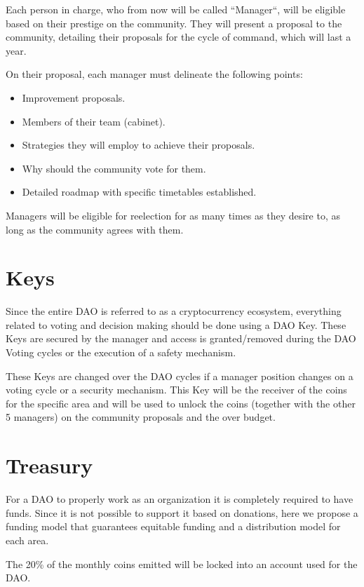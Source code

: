 \documentclass{article}
\begin{document}
Each person in charge, who from now will be called ``Manager``, will be eligible based on their prestige on the community. They will present a proposal to the community, detailing their proposals for the cycle of command, which will last a year.

On their proposal, each manager must delineate the following points:

\begin{itemize}
  \item Improvement proposals.
  \item Members of their team (cabinet).
  \item Strategies they will employ to achieve their proposals.
  \item Why should the community vote for them.
  \item Detailed roadmap with specific timetables established.
\end{itemize}

Managers will be eligible for reelection for as many times as they desire to, as long as the community agrees with them.

\section{Keys}

Since the entire DAO is referred to as a cryptocurrency ecosystem, everything related to voting and decision making should be done using a DAO Key. These Keys are secured by the manager and access is granted/removed during the DAO Voting cycles or the execution of a safety mechanism.

These Keys are changed over the DAO cycles if a manager position changes on a voting cycle or a security mechanism. This Key will be the receiver of the coins for the specific area and will be used to unlock the coins (together with the other 5 managers) on the community proposals and the over budget.

\section{Treasury}

For a DAO to properly work as an organization it is completely required to have funds. Since it is not possible to support it based on donations, here we propose a funding model that guarantees equitable funding and a distribution model for each area.

The 20\% of the monthly coins emitted will be locked into an account used for the DAO.
\end{document}
